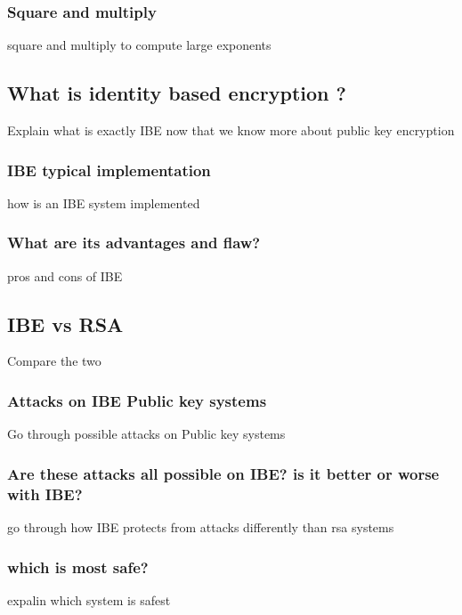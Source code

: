 \documentclass[conference]{IEEEtran}
\begin{document}
\subsubsection{Square and multiply}
square and multiply to compute large exponents

\subsection{What is identity based encryption ?}
Explain what is exactly IBE now that we know more about public key encryption

\subsubsection{IBE typical implementation}
how is an IBE system implemented

\subsubsection{What are its advantages and flaw?}
pros and cons of IBE

\subsection{IBE vs RSA}
Compare the two

\subsubsection{Attacks on IBE Public key systems}
Go through possible attacks on Public key systems

\subsubsection{Are these attacks all possible on IBE? is it better or worse with IBE?}
go through how IBE protects from attacks differently than rsa systems

\subsubsection{which is most safe?}
expalin which system is safest
\end{document}

